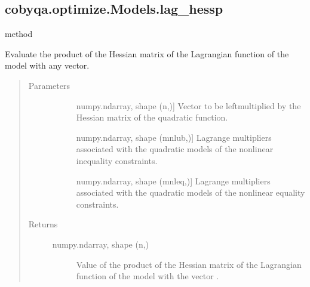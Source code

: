 \documentclass[letterpaper,10pt,english]{sphinxmanual}
\begin{document}
\begin{fulllineitems}
\begin{fulllineitems}
\end{fulllineitems}



\subsection{cobyqa.optimize.Models.lag\_hessp}
\label{\detokenize{refs/generated/cobyqa.optimize.Models.lag_hessp:cobyqa-optimize-models-lag-hessp}}\label{\detokenize{refs/generated/cobyqa.optimize.Models.lag_hessp::doc}}
\sphinxAtStartPar
method

\begin{fulllineitems}
\label{\detokenize{refs/generated/cobyqa.optimize.Models.lag_hessp:cobyqa.optimize.Models.lag_hessp}}
\sphinxAtStartPar
Evaluate the product of the Hessian matrix of the Lagrangian function of
the model with any vector.
\begin{quote}\begin{description}
\item[{Parameters}] \leavevmode\begin{description}
\item[{}] \leavevmode{[}numpy.ndarray, shape (n,){]}
\sphinxAtStartPar
Vector to be left\sphinxhyphen{}multiplied by the Hessian matrix of the quadratic
function.

\item[{}] \leavevmode{[}numpy.ndarray, shape (mnlub,){]}
\sphinxAtStartPar
Lagrange multipliers associated with the quadratic models of the
nonlinear inequality constraints.

\item[{}] \leavevmode{[}numpy.ndarray, shape (mnleq,){]}
\sphinxAtStartPar
Lagrange multipliers associated with the quadratic models of the
nonlinear equality constraints.

\end{description}

\item[{Returns}] \leavevmode\begin{description}
\item[{numpy.ndarray, shape (n,)}] \leavevmode
\sphinxAtStartPar
Value of the product of the Hessian matrix of the Lagrangian
function of the model with the vector .


\end{description}
\end{description}
\end{quote}
\end{fulllineitems}
\end{fulllineitems}
\end{document}
